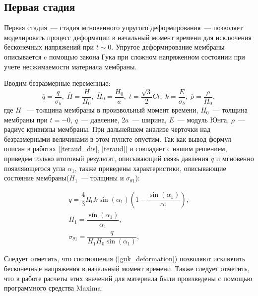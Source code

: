 	\subsection{Первая стадия}

Первая стадия~--- стадия мгновенного упругого деформирования~--- позволяет моделировать процесс деформации в начальный момент времени для исключения бесконечных
	напряжений при $t \sim 0$.
	Упругое деформирование мембраны описывается c помощью закона Гука при сложном напряженном состоянии при учете несжимаемости материала мембраны.
	
	
	Вводим безразмерные переменные:
	\begin{equation}
		\overline{q} = \dfrac{q}{\sigma_b}, \;
		\overline{H} = \dfrac{H}{H_0}, \;
		\overline{H}_0 = \dfrac{H_0}{a}, \;
		\overline{t} = \dfrac{\sqrt 3}{2}Ct,\;
		k = \dfrac{E}{\sigma_b},\;
		\overline{\rho} = \dfrac{\rho}{H_0},
	\end{equation}
	где $H$ ~--- толщина мембраны в произвольный момент времени, $H_0$~--- толщина мембраны при $t = -0$, $q$~--- давление, $2a$~--- ширина,
	$E$~--- модуль Юнга, $\rho$~--- радиус кривизны мембраны.
	При дальнейшем анализе черточки над безразмерными величинами в этом пункте  опустим. Так как вывод формул описан в работах  [\ref{teraud_dis}, \ref{teraud}]
	и совпадает с нашим решением, приведем только итоговый результат, описывающий связь давления $q$ и мгновенно появляющегося угла $\alpha_1$,
	также приведены характеристики, описывающие состояние мембраны($H_1$~--- толщины и $\sigma_{\theta1}$):

	\begin{equation}
	\begin{split}
		q = \dfrac43 H_0k\sin(\alpha_1)\left(1-\dfrac{\sin(\alpha_1)}{\alpha_1} \right), \\
		H_1 = \dfrac{\sin(\alpha_1)}{\alpha_1},\\
		\sigma_{\theta1} = \dfrac{q}{H_1H_0\sin(\alpha_1)},
	\end{split}
	\label{guk_deformation}
	\end{equation}
	
	Следует отметить, что соотношения (\ref{guk_deformation}) позволяют исключить бесконечные напряжения в начальный момент времени.
	Также следует отметить, что в работе расчеты этих значений для материала были произведены с помощью программного средства Maxima.
	 
